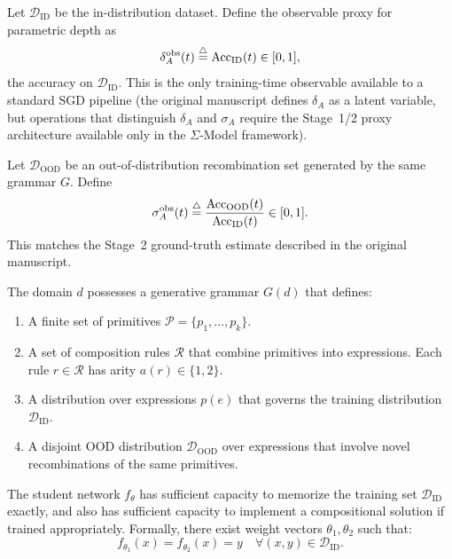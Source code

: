 
\begin{definition}
Let $\mathcal{D}_{\text{ID}}$ be the in-distribution dataset.
Define the observable proxy for parametric depth as
\[
\delta_A^{\text{obs}}(t) \stackrel{\triangle}{=} \text{Acc}_{\text{ID}}(t) \in [0,1],
\]
the accuracy on $\mathcal{D}_{\text{ID}}$. This is the only training-time
observable available to a standard SGD pipeline (the original manuscript
defines $\delta_A$ as a latent variable, but operations
that distinguish $\delta_A$ and $\sigma_A$ require the Stage~1/2 proxy
architecture available only in the $\Sigma$-Model framework).
\end{definition}

\begin{definition}
Let $\mathcal{D}_{\text{OOD}}$ be an out-of-distribution recombination set
generated by the same grammar $G$. Define
\[
\sigma_A^{\text{obs}}(t) \stackrel{\triangle}{=} \frac{\text{Acc}_{\text{OOD}}(t)}{\text{Acc}_{\text{ID}}(t)} \in [0,1].
\]
This matches the Stage~2 ground-truth estimate described in the
original manuscript.
\end{definition}

\begin{assumption}
The domain $d$ possesses a generative grammar $G(d)$ that defines:
\begin{enumerate}[nosep]
\item A finite set of primitives $\mathcal{P} = \{p_1, \dots, p_k\}$.
\item A set of composition rules $\mathcal{R}$ that combine primitives
  into expressions. Each rule $r \in \mathcal{R}$ has arity $a(r) \in \{1,2\}$.
\item A distribution over expressions $p(e)$ that governs the training
  distribution $\mathcal{D}_{\text{ID}}$.
\item A disjoint OOD distribution $\mathcal{D}_{\text{OOD}}$ over
  expressions that involve novel recombinations of the same primitives.
\end{enumerate}
\end{assumption}

\begin{assumption}
The student network $f_\theta$ has sufficient capacity to memorize
the training set $\mathcal{D}_{\text{ID}}$ exactly, and also has sufficient
capacity to implement a compositional solution if trained appropriately.
Formally, there exist weight vectors $\theta_1, \theta_2$ such that:
\[
f_{\theta_1}(x) = f_{\theta_2}(x) = y \quad \forall (x,y) \in \mathcal{D}_{\text{ID}}.
\]
\end{assumption}

